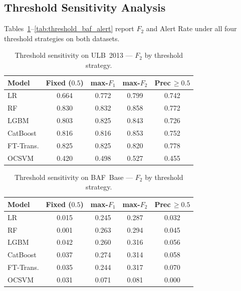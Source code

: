 \documentclass[a4paper,fleqn]{cas-sc}
\begin{document}
\subsection{Threshold Sensitivity Analysis}
\label{subsec:threshold_results}

Tables~\ref{tab:threshold_ulb_f2}--\ref{tab:threshold_baf_alert} report $F_2$ and
Alert Rate under all four threshold strategies on both datasets.

\begin{table}[ht!]
\centering
\caption{Threshold sensitivity on ULB~2013 --- $F_2$ by threshold strategy.}
\label{tab:threshold_ulb_f2}
\begin{tabular}{l c c c c}
\toprule
Model & Fixed ($0.5$) & max-$F_1$ & max-$F_2$ & Prec\,$\geq\!0.5$ \\
\midrule
LR         & 0.664 & 0.772 & 0.799 & 0.742 \\
RF         & 0.830 & 0.832 & 0.858 & 0.772 \\
LGBM       & 0.803 & 0.825 & 0.843 & 0.726 \\
CatBoost   & 0.816 & 0.816 & 0.853 & 0.752 \\
FT-Trans.  & 0.825 & 0.825 & 0.820 & 0.778 \\
OCSVM      & 0.420 & 0.498 & 0.527 & 0.455 \\
\bottomrule
\end{tabular}
\end{table}

\begin{table}[ht!]
\centering
\caption{Threshold sensitivity on BAF~Base --- $F_2$ by threshold strategy.}
\label{tab:threshold_baf_f2}
\begin{tabular}{l c c c c}
\toprule
Model & Fixed ($0.5$) & max-$F_1$ & max-$F_2$ & Prec\,$\geq\!0.5$ \\
\midrule
LR         & 0.015 & 0.245 & 0.287 & 0.032 \\
RF         & 0.001 & 0.263 & 0.294 & 0.045 \\
LGBM       & 0.042 & 0.260 & 0.316 & 0.056 \\
CatBoost   & 0.037 & 0.274 & 0.314 & 0.058 \\
FT-Trans.  & 0.035 & 0.244 & 0.317 & 0.070 \\
OCSVM      & 0.031 & 0.071 & 0.081 & 0.000 \\
\bottomrule
\end{tabular}
\end{table}
\end{document}

